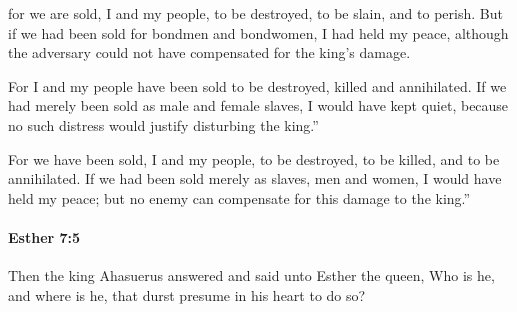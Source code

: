 			\begin{versebox}
					\item[BHS] 
					\item[LXX] 
					\item[ASV] for we are sold, I and my people, to be destroyed, to be slain, and to perish. But if we had been sold for bondmen and bondwomen, I had held my peace, although the adversary could not have compensated for the king's damage.
					\item[NIV] For I and my people have been sold to be destroyed, killed and annihilated. If we had merely been sold as male and female slaves, I would have kept quiet, because no such distress would justify disturbing the king.”
					\item[NRSV] For we have been sold, I and my people, to be destroyed, to be killed, and to be annihilated. If we had been sold merely as slaves, men and women, I would have held my peace; but no enemy can compensate for this damage to the king.”
			\end{versebox}

		\paragraph{Esther 7:5} %
			\label{ESTHER-7-5}

			Then the king Ahasuerus answered and said unto Esther the queen, Who is he, and where is he, that durst presume in his heart to do so?

